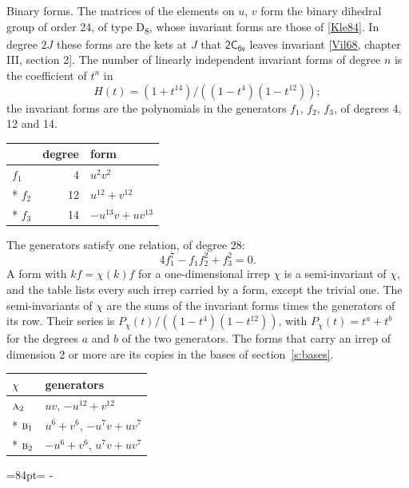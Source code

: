 \documentclass[10pt,a4paper]{article}
\makeatletter
\renewcommand\paragraph{\@startsection{paragraph}{4}{\z@}{1.5ex plus .5ex minus .2ex}{-1em}%
  {\normalfont\small\sffamily\bfseries\color{parttitle}}}
\newcommand{\needspace}[1]{\par\penalty-100\begingroup\dimen0=#1\relax\dimen2=\pagegoal
  \advance\dimen2-\pagetotal\ifdim\dimen0>\dimen2\relax\ifdim\dimen2>0pt\vfil\break\fi\fi
  \endgroup}
\numberwithin{equation}{section}
\newcommand{\grp}[1]{\mathsf{#1}}
\newcommand{\irr}[1]{\text{\normalfont\scshape #1}}
\makeatother
\begin{document}
\paragraph{Binary forms.}
The matrices of the elements on $u$, $v$ form the binary dihedral group of order 24, of type D\textsubscript{8}, whose invariant forms are those of [\href{../../../REFERENCES.pdf\#ref.Kle84}{Kle84}]. In degree $2J$ these forms are the kets at $J$ that $\grp{2C_{6v}}$ leaves invariant [\href{../../../REFERENCES.pdf\#ref.Vil68}{Vil68}, chapter III, section 2]. \label{n:head.degree}\label{n:head.form}The number of linearly independent invariant forms of degree $n$ is the coefficient of $t^n$ in
\begin{equation}\label{e:molien}H(t) = (1 + t^{14})/((1-t^{4})(1-t^{12}));\end{equation}
the invariant forms are the polynomials in the generators $f_1$, $f_2$, $f_3$, of degrees 4, 12 and 14.
{\small\begin{longtable}{@{}lrl@{}}\toprule
& degree & form\\\midrule\endhead
\bottomrule\endfoot\endlastfoot
$f_{1}$ & 4 & $u^{2}v^{2}$\\*
$f_{2}$ & 12 & $u^{12} + v^{12}$\\*
$f_{3}$ & 14 & $-u^{13}v + uv^{13}$\\
\bottomrule\end{longtable}}
The generators satisfy one relation, of degree 28:
\begin{equation}\label{e:relation}4f_{1}^{7} - f_{1}f_{2}^{2} + f_{3}^{2} = 0.\end{equation}
A form with $k f = \chi(k) f$ for a one-dimensional irrep $\chi$ is a semi-invariant of $\chi$, and the table lists every such irrep carried by a form, except the trivial one. \label{n:head.generators}The semi-invariants of $\chi$ are the sums of the invariant forms times the generators of its row. Their series is $P_\chi(t)/((1-t^{4})(1-t^{12}))$, with $P_\chi(t) = t^{a} + t^{b}$ for the degrees $a$ and $b$ of the two generators. The forms that carry an irrep of dimension 2 or more are its copies in the bases of section~\ref{s:bases}.
{\small\begin{longtable}{@{}ll@{}}\toprule
$\chi$ & generators\\\midrule\endhead
\bottomrule\endfoot\endlastfoot
$\irr{a}_{2}$ & $uv$, $-u^{12} + v^{12}$\\*
$\irr{b}_{1}$ & $u^{6} + v^{6}$, $-u^{7}v + uv^{7}$\\*
$\irr{b}_{2}$ & $-u^{6} + v^{6}$, $u^{7}v + uv^{7}$\\
\bottomrule\end{longtable}}
\needspace{84pt}
\end{document}
